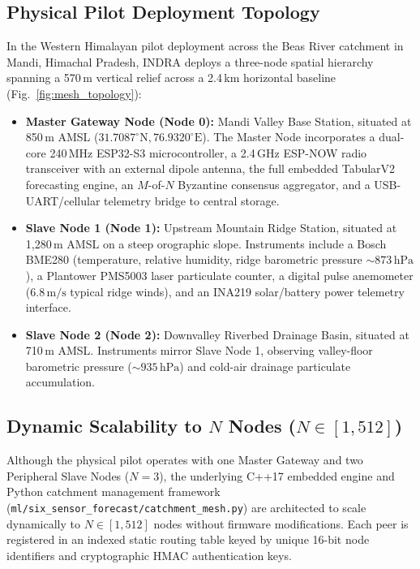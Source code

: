 \documentclass[journal,a4paper]{IEEEtran}
\begin{document}
\subsection{Physical Pilot Deployment Topology}

In the Western Himalayan pilot deployment across the Beas River catchment in Mandi, Himachal Pradesh, INDRA deploys a three-node spatial hierarchy spanning a 570\,m vertical relief across a 2.4\,km horizontal baseline (Fig.~\ref{fig:mesh_topology}):
\begin{itemize}
  \item \textbf{Master Gateway Node (Node 0):} Mandi Valley Base Station, situated at 850\,m AMSL ($31.7087^\circ\text{N}, 76.9320^\circ\text{E}$). The Master Node incorporates a dual-core 240\,MHz ESP32-S3 microcontroller, a 2.4\,GHz ESP-NOW radio transceiver with an external dipole antenna, the full embedded TabularV2 forecasting engine, an $M$-of-$N$ Byzantine consensus aggregator, and a USB-UART/cellular telemetry bridge to central storage.
  \item \textbf{Slave Node 1 (Node 1):} Upstream Mountain Ridge Station, situated at 1{,}280\,m AMSL on a steep orographic slope. Instruments include a Bosch BME280 (temperature, relative humidity, ridge barometric pressure $\sim 873\,\text{hPa}$), a Plantower PMS5003 laser particulate counter, a digital pulse anemometer ($6.8\,\si{\metre\per\second}$ typical ridge winds), and an INA219 solar/battery power telemetry interface.
  \item \textbf{Slave Node 2 (Node 2):} Downvalley Riverbed Drainage Basin, situated at 710\,m AMSL. Instruments mirror Slave Node 1, observing valley-floor barometric pressure ($\sim 935\,\text{hPa}$) and cold-air drainage particulate accumulation.
\end{itemize}

\subsection{Dynamic Scalability to $N$ Nodes ($N \in [1, 512]$)}

Although the physical pilot operates with one Master Gateway and two Peripheral Slave Nodes ($N=3$), the underlying C++17 embedded engine and Python catchment management framework (\nolinkurl{ml/six_sensor_forecast/catchment_mesh.py}) are architected to scale dynamically to $N \in [1, 512]$ nodes without firmware modifications. Each peer is registered in an indexed static routing table keyed by unique 16-bit node identifiers and cryptographic HMAC authentication keys.
\end{document}

